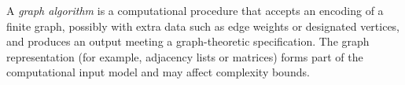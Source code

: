 
A \emph{graph algorithm} is a computational procedure that accepts an encoding of a finite graph, possibly with extra data such as edge weights or designated vertices, and produces an output meeting a graph-theoretic specification. The graph representation (for example, adjacency lists or matrices) forms part of the computational input model and may affect complexity bounds.
